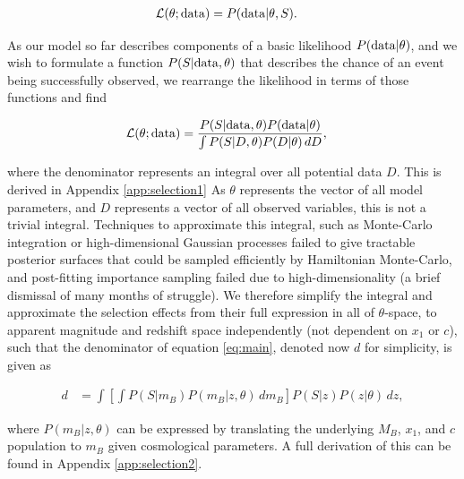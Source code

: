 \documentclass[a4paper,fleqn,usenatbib]{mnras}
\begin{document}
\begin{align}
\mathcal{L}(\theta; {\rm data}) &= P({\rm data} | \theta, S). \label{eq:like}
\end{align}

As our model so far describes components of a basic likelihood $P({\rm data}|\theta)$, and we wish to formulate a function $P(S|{\rm data},\theta)$ that describes the chance of an event being successfully observed, we rearrange the likelihood in terms of those functions and find

\begin{align}
\mathcal{L}(\theta; {\rm data}) &= \frac{P(S|{\rm data},\theta) P({\rm data}|\theta)}{\int P(S | D, \theta) P(D|\theta)\, dD}, \label{eq:main}
\end{align}

where the denominator represents an integral over all potential data $D$. This is derived in Appendix \ref{app:selection1} As $\theta$ represents the vector of all model parameters, and $D$ represents a vector of all observed variables, this is not a trivial integral. Techniques to approximate this integral, such as Monte-Carlo integration or high-dimensional Gaussian processes failed to give tractable posterior surfaces that could be sampled efficiently by Hamiltonian Monte-Carlo, and post-fitting importance sampling failed due to high-dimensionality (a brief dismissal of many months of struggle). We therefore simplify the integral and approximate the selection effects from their full expression in all of $\theta$-space, to apparent magnitude and redshift space independently (not dependent on $x_1$ or $c$), such that the denominator of equation \eqref{eq:main}, denoted now $d$ for simplicity, is given as

\begin{align}
d &= \int  \left[ \int P(S|m_B) P(m_B | z, \theta)\, d m_B \right] P(S|z) P(z|\theta)\, dz, \label{eq:w1}
\end{align}

where $P(m_B | z, \theta)$ can be expressed by translating the underlying $M_B$, $x_1$, and $c$ population to $m_B$ given cosmological parameters. A full derivation of this can be found in Appendix \ref{app:selection2}.
\end{document}

